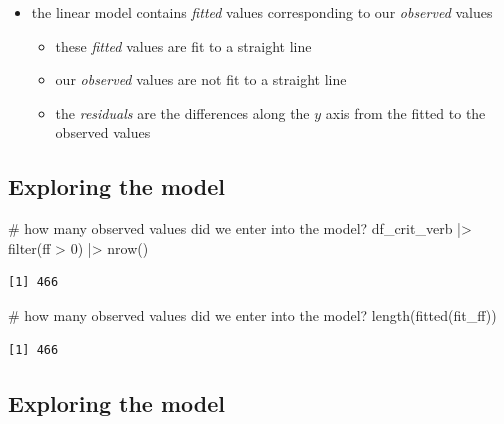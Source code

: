 \documentclass[
  letterpaper,
  DIV=11,
  numbers=noendperiod]{scrartcl}
\newenvironment{Shaded}{\begin{snugshade}}{\end{snugshade}}
\newcommand{\CommentTok}[1]{\textcolor[rgb]{0.37,0.37,0.37}{#1}}
\newcommand{\DecValTok}[1]{\textcolor[rgb]{0.68,0.00,0.00}{#1}}
\newcommand{\FunctionTok}[1]{\textcolor[rgb]{0.28,0.35,0.67}{#1}}
\newcommand{\NormalTok}[1]{\textcolor[rgb]{0.00,0.23,0.31}{#1}}
\newcommand{\SpecialCharTok}[1]{\textcolor[rgb]{0.37,0.37,0.37}{#1}}
\providecommand{\tightlist}{%
  \setlength{\itemsep}{0pt}\setlength{\parskip}{0pt}}\usepackage{longtable,booktabs,array}
\begin{document}
\begin{itemize}
\tightlist
\item
  the linear model contains \emph{fitted} values corresponding to our
  \emph{observed} values

  \begin{itemize}
  \tightlist
  \item
    these \emph{fitted} values are fit to a straight line
  \item
    our \emph{observed} values are not fit to a straight line
  \item
    the \emph{residuals} are the differences along the \(y\) axis from
    the fitted to the observed values
  \end{itemize}
\end{itemize}

\hypertarget{exploring-the-model-1}{%
\subsection*{Exploring the model}\label{exploring-the-model-1}}

\begin{Shaded}
\begin{Highlighting}[]
\CommentTok{\# how many observed values did we enter into the model?}
\NormalTok{df\_crit\_verb }\SpecialCharTok{|\textgreater{}} 
  \FunctionTok{filter}\NormalTok{(ff }\SpecialCharTok{\textgreater{}} \DecValTok{0}\NormalTok{) }\SpecialCharTok{|\textgreater{}} 
  \FunctionTok{nrow}\NormalTok{()}
\end{Highlighting}
\end{Shaded}

\begin{verbatim}
[1] 466
\end{verbatim}

\begin{Shaded}
\begin{Highlighting}[]
\CommentTok{\# how many observed values did we enter into the model?}
\FunctionTok{length}\NormalTok{(}\FunctionTok{fitted}\NormalTok{(fit\_ff))}
\end{Highlighting}
\end{Shaded}

\begin{verbatim}
[1] 466
\end{verbatim}

\hypertarget{exploring-the-model-2}{%
\subsection*{Exploring the model}\label{exploring-the-model-2}}
\end{document}
